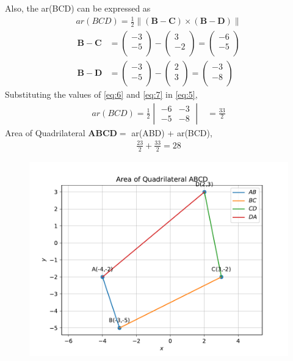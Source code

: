 \documentclass[12pt]{article}
\newcommand{\mydet}[1]{\ensuremath{\begin{vmatrix}#1\end{vmatrix}}}
\providecommand{\brak}[1]{\ensuremath{\left(#1\right)}}
\providecommand{\norm}[1]{\left\lVert#1\right\rVert}
\newcommand{\myvec}[1]{\ensuremath{\begin{pmatrix}#1\end{pmatrix}}}
\let\vec\mathbf
\begin{document}
\begin{enumerate}
		Also, the ar(BCD) can be expressed as
  \begin{align}
	  ar(BCD)=\frac{1}{2} \norm{\brak{\vec{B}-\vec{C}}  \times 
   \brak{\vec{B}- \vec{D}}} \label{eq:5}
\end{align}
\begin{align}
	\vec{B}- \vec{C} &= \myvec{-3\\-5\\}-\myvec{3\\-2\\}=\myvec{-6\\-5\\}\label{eq:6} \\
	  \vec{B}- \vec{D} &= \myvec{-3\\-5\\}-\myvec{2\\3\\}=\myvec{-3\\-8\\}\label{eq:7} 
  \end{align}
		Substituting the values of \eqref{eq:6} and \eqref{eq:7} in \eqref{eq:5},	\begin{align}
	ar(BCD)=\frac{1}{2}\mydet{-6 & -3\\-5 & -8}  
	&=\frac{33}{2}
\end{align}
		Area of Quadrilateral $\vec{A}\vec{B}\vec{C}\vec{D} = $ ar(ABD) +  ar(BCD),
\begin{align}
	\frac{23}{2}+\frac{33}{2} = 28
\end{align}
\begin{figure}[!h]
 \begin{center}
  \includegraphics[width=\columnwidth]{figs/fig.pdf}
 \end{center}
\caption{}
\label{fig:Fig1}
\end{figure}
\end{enumerate}
\end{document}
